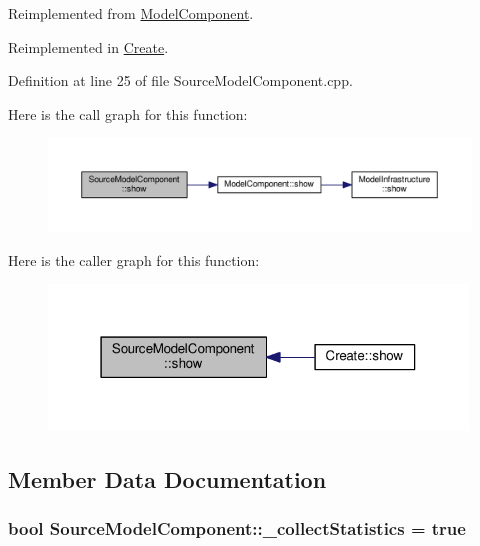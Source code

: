 Reimplemented from \hyperlink{class_model_component_ad8bc846e36b028eab7efb7da6c549eca}{Model\-Component}.



Reimplemented in \hyperlink{class_create_a8d1832d2165bbeea4a5a88aded883f86}{Create}.



Definition at line 25 of file Source\-Model\-Component.\-cpp.



Here is the call graph for this function\-:\nopagebreak
\begin{figure}[H]
\begin{center}
\leavevmode
\includegraphics[width=350pt]{class_source_model_component_a4011597b5780fcc0495e8e22ab8158f6_cgraph}
\end{center}
\end{figure}




Here is the caller graph for this function\-:
\nopagebreak
\begin{figure}[H]
\begin{center}
\leavevmode
\includegraphics[width=316pt]{class_source_model_component_a4011597b5780fcc0495e8e22ab8158f6_icgraph}
\end{center}
\end{figure}




\subsection{Member Data Documentation}
\hypertarget{class_source_model_component_ac0c009ff9a2e8169d251118dabcd19eb}{
\subsubsection[{\-\_\-collect\-Statistics}]{\setlength{\rightskip}{0pt plus 5cm}bool Source\-Model\-Component\-::\-\_\-collect\-Statistics = true\hspace{0.3cm}{\ttfamily [protected]}}}\label{class_source_model_component_ac0c009ff9a2e8169d251118dabcd19eb}



